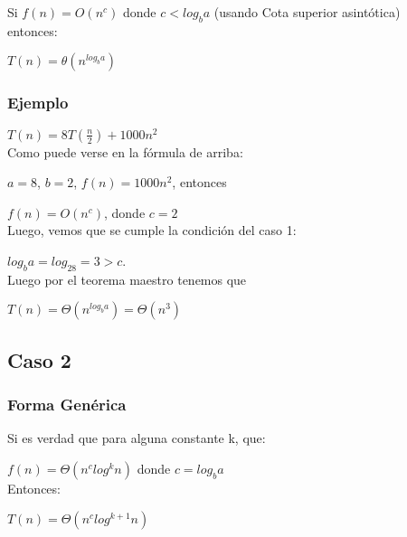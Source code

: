 \documentclass[12pt, letterpaper]{article} %
\begin{document}
Si $f(n)=O(n^c)$ donde $c<log_b a$ (usando Cota superior asintótica) \\
entonces:

\par \hspace{2mm} $T(n)= \theta(n^{log_ba})$

\subsubsection{Ejemplo}
$T(n)=8T(\frac{n}{2})+1000n^2$\\
Como puede verse en la fórmula de arriba:
\par \hspace{2mm} $a=8$, $b=2$, $f(n)=1000n^2$, entonces 
\par \hspace{2mm} $f(n)=O(n^c)$, donde $c=2$\\
Luego, vemos que se cumple la condición del caso 1:
\par \hspace{2mm} $log_ba=log_28=3>c$.\\
Luego por el teorema maestro tenemos que
\par \hspace{2mm} $T(n)=\Theta(n^{log_ba})=\Theta(n^3)$

\subsection{Caso 2}

\subsubsection{Forma Genérica}
Si es verdad que para alguna constante k, que:
\par\hspace{2mm} $f(n)=\Theta(n^clog^kn)$ donde $c=log_ba$\\
Entonces:
\par \hspace{2mm} $T(n)=\Theta(n^clog^{k+1}n)$
\end{document}

